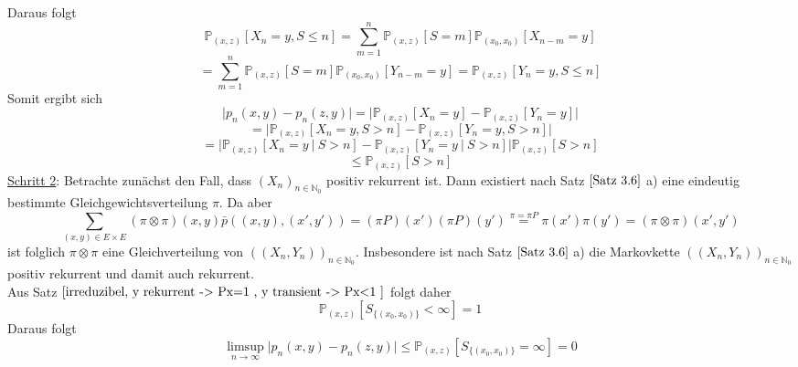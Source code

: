 Daraus folgt
\begin{equation*}
\mathbb{P}_{(x,z)}[X_{n}=y, S \leq n] = \sum_{m=1}^{n} \mathbb{P}_{(x,z)}[S=m]\mathbb{P}_{(x_{0},x_{0})}[X_{n-m}=y]
\end{equation*}
\begin{equation*}
= \sum_{m=1}^{n} \mathbb{P}_{(x,z)}[S=m]\mathbb{P}_{(x_{0},x_{0})}[Y_{n-m}=y] = \mathbb{P}_{(x,z)}[Y_{n}=y, S \leq n]
\end{equation*}
Somit ergibt sich
\begin{equation*}
\vert p_{n}(x,y) - p_{n}(z,y) \vert = \vert \mathbb{P}_{(x,z)}[X_{n}=y] - \mathbb{P}_{(x,z)}[Y_{n} =y] \vert
\end{equation*}
\begin{equation*}
= \vert \mathbb{P}_{(x,z)}[X_{n}=y, S>n] - \mathbb{P}_{(x,z)}[Y_{n} =y, S>n] \vert
\end{equation*}
\begin{equation*}
= \vert \mathbb{P}_{(x,z)}[X_{n}=y \: | \: S>n] - \mathbb{P}_{(x,z)}[Y_{n} =y \: | \: S>n] \vert \mathbb{P}_{(x,z)}[S>n]
\end{equation*}
\begin{equation*}
\leq \mathbb{P}_{(x,z)}[S>n]
\end{equation*}
\underline{Schritt 2}: Betrachte zunächst den Fall, dass $(X_{n})_{n \in \mathbb{N}_{0}}$ positiv rekurrent ist. Dann existiert nach Satz $\ref{Satz 3.6}$ a) eine eindeutig bestimmte Gleichgewichtsverteilung $\pi$. Da aber
\begin{equation*}
\sum_{(x,y) \in E \times E} (\pi \otimes \pi)(x,y)\bar{p}\left( (x,y),(x',y') \right) = (\pi P)(x')(\pi P)(y') \stackrel{\pi = \pi P}{=} \pi(x') \pi(y') = (\pi \otimes \pi)(x',y')
\end{equation*}
ist folglich $\pi \otimes \pi$ eine Gleichverteilung von $((X_{n},Y_{n}))_{n \in \mathbb{N}_{0}}$. Insbesondere ist nach Satz $\ref{Satz 3.6}$ a) die Markovkette  $((X_{n},Y_{n}))_{n \in \mathbb{N}_{0}}$ positiv rekurrent und damit auch rekurrent.
\\
Aus Satz $\ref{irreduzibel, y rekurrent -> Px=1 , y transient -> Px<1 }$ folgt daher
\begin{equation*}
\mathbb{P}_{(x,z)}[S_{\lbrace (x_{0},x_{0}) \rbrace} < \infty] =1
\end{equation*}
Daraus folgt
\begin{equation*}
\limsup_{n \to \infty} \vert p_{n}(x,y) - p_{n}(z,y) \vert \leq \mathbb{P}_{(x,z)}[S_{\lbrace (x_{0},x_{0}) \rbrace} = \infty] = 0
\end{equation*}
